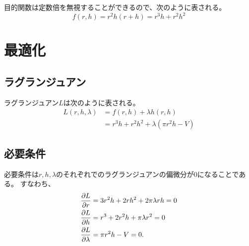 \documentclass{jsarticle}
\begin{document}
目的関数は定数倍を無視することができるので、次のように表される。
\begin{equation}
  f(r, h) = r^2 h (r+h)
  = r^3h + r^2h^2
\end{equation}

\section{最適化}
\subsection{ラグランジュアン}
ラグランジュアン$L$は次のように表される。
\begin{align}
  L(r, h, \lambda) &= f(r, h) + \lambda h(r, h) \\
                   &= r^3h + r^2h^2 + \lambda (\pi r^2 h - V)
\end{align}

\subsection{必要条件}
必要条件は$r, h, \lambda$のそれぞれでのラグランジュアンの偏微分が$0$になることである。
すなわち、
\begin{align}
  \pdv{L}{r}&= 3r^2h + 2rh^2 + 2\pi\lambda rh
  =0 \label{eq:d-r} \\
  \pdv{L}{h}&= r^3 + 2r^2h + \pi\lambda r^2
  =0 \label{eq:d-h} \\ 
  \pdv{L}{\lambda}&= \pi r^2h-V
  =0.\label{eq:d-lambda}
\end{align}
\end{document}
